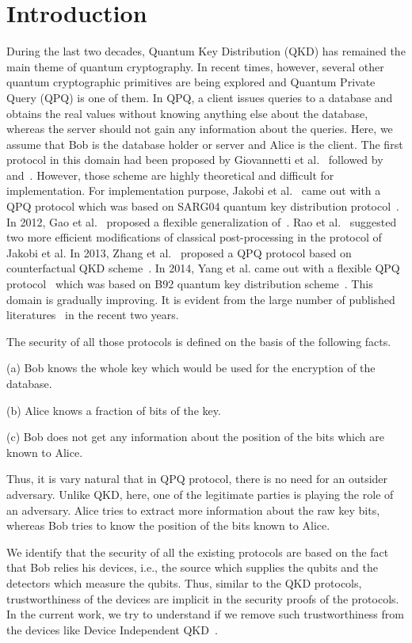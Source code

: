 \documentclass[twocolumn,pra,aps,amssymb]{revtex4}
\begin{document}
\section{Introduction}
During the last two decades, Quantum Key Distribution (QKD) has remained the main theme of quantum cryptography. In recent times, however, several other quantum cryptographic primitives are being explored and 
Quantum Private Query (QPQ) is one of them. In QPQ, a client issues queries to a database and obtains the real values without knowing anything else about the database, whereas the server should not gain any information about the queries. Here, we assume that Bob is the database holder or server and Alice is the client.
The first protocol in this domain had been proposed by  Giovannetti et al.~\cite{GLM} followed by ~\cite{GLM11} and~\cite{Olejnik}. However, those scheme are highly theoretical and difficult for implementation. For implementation purpose, Jakobi et al.~\cite{jakobi} came out with a QPQ protocol which was based on SARG04 quantum key distribution protocol~\cite{SARG}. In 2012, Gao et al.~\cite{Gao} proposed a flexible generalization of~\cite{jakobi}. Rao et al.~\cite{Rao} suggested two more efficient modifications of classical post-processing in the protocol of Jakobi et al. In 2013, Zhang et al.~\cite{Zhang} proposed a QPQ protocol based on counterfactual QKD scheme~\cite{Noh}. In 2014, Yang et al. came out with a flexible QPQ protocol~\cite{Yang} which was based on B92 quantum key distribution scheme~\cite{b92}. This domain is gradually improving. It is evident from the large number of published literatures~\cite{Wei,Chan,Gao2,Liu} in the recent two years. 


The security of all those protocols is defined on the basis of the following facts.

(a) Bob knows the whole key which would be used for the encryption of the database.

(b) Alice knows a fraction of bits of the key.

(c) Bob does not get any information about the position of the bits which are known to Alice.

Thus, it is vary natural that in QPQ protocol, there is no need for an outsider adversary. Unlike QKD, here, one of the legitimate parties is playing the role of an adversary. Alice tries to extract more information about the raw key bits, whereas Bob tries to know the position of the bits known to Alice. 

We identify that the security of all the existing protocols are based on the fact that Bob relies his devices, i.e., the source which supplies the qubits and the detectors which measure the qubits. Thus, similar to the QKD protocols, trustworthiness of the devices are implicit in the security proofs of the protocols. In the current work, we try to understand if we remove such trustworthiness from the devices like Device Independent QKD~\cite{yao,acin06a,acin06b,scarani06,Acin}.
\end{document}
